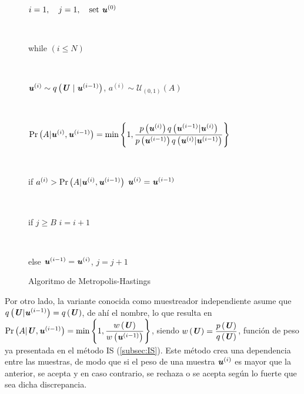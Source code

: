 \begin{figure}[ht]
    \centering
    \begin{tcolorbox}[colframe=black, colback=white, boxrule=0.5pt, width=0.8\textwidth, sharp corners]
        \parbox[t]{\linewidth}{$i=1, \quad j=1, \quad \text{set } \textbf{\textit{u}}^{(0)}$} \\[0.5em]
        \parbox[t]{\linewidth}{while $(i \leq N)$} \\[0.5em]
        \parbox[t]{\linewidth}{\hspace{1em} $\textbf{\textit{u}}^{(i)} \sim  q\left( \textbf{\textit{U}} \mid \textbf{\textit{u}}^{(i-1)} \right)$, \quad $a^{(i)} \sim \mathcal{U}_{(0,1)}\left(A\right)$} \\[0.5em]
        \parbox[t]{\linewidth}{\hspace{1em} $\text{Pr}\left(A|\textbf{\textit{u}}^{(i)}, \textbf{\textit{u}}^{(i-1)}\right) = \min\left\{1, \dfrac{p\left(\textbf{\textit{u}}^{(i)}\right)q\left(\textbf{\textit{u}}^{(i-1)}|\textbf{\textit{u}}^{(i)}\right)}{p\left(\textbf{\textit{u}}^{(i-1)}\right)q\left(\textbf{\textit{u}}^{(i)}|\textbf{\textit{u}}^{(i-1)}\right)}\right\}$} \\[0.5em]
        \parbox[t]{\linewidth}{\hspace{1em} if $a^{(i)} > \text{Pr}\left(A|\textbf{\textit{u}}^{(i)}, \textbf{\textit{u}}^{(i-1)}\right)$  $\textbf{\textit{u}}^{(i)} = \textbf{\textit{u}}^{(i-1)}$} \\[0.5em]
        \parbox[t]{\linewidth}{\hspace{1em} if $j \geq B$  $i = i+1$} \\[0.5em]
        \parbox[t]{\linewidth}{\hspace{1em} else $\textbf{\textit{u}}^{(i-1)} = \textbf{\textit{u}}^{(i)}$, \quad $j = j+1$}
    \end{tcolorbox}
    \caption{Algoritmo de Metropolis-Hastings}
    \label{fig:3.5}
\end{figure}

Por otro lado, la variante conocida como muestreador independiente asume que $q\left(\textbf{\textit{U}}|\textbf{\textit{u}}^{(i-1)}\right) = q\left(\textbf{\textit{U}}\right)$, de ahí el nombre, lo que resulta en $\text{Pr}\left(A|\textbf{\textit{U}}, \textbf{\textit{u}}^{(i-1)}\right) = \text{min}\left\{1, \dfrac{w\left(\textbf{\textit{U}}\right)}{w\left(\textbf{\textit{u}}^{(i-1)}\right)}\right\}$, siendo $w\left(\textbf{\textit{U}}\right) = \dfrac{p\left(\textbf{\textit{U}}\right)}{q\left(\textbf{\textit{U}}\right)}$, función de peso ya presentada en el método IS (\ref{subsec:IS}).
Este método crea una dependencia entre las muestras, de modo que si el peso de una muestra $\textbf{\textit{u}}^{(i)}$ es mayor que la anterior, se acepta y en caso contrario, se rechaza o se acepta según lo fuerte que sea dicha discrepancia.


